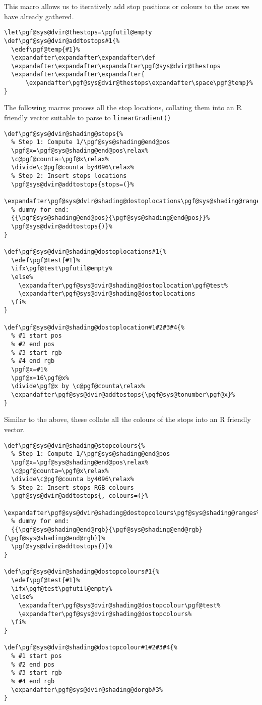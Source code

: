 \documentclass[]{article}
\begin{document}
This macro allows us to iteratively add stop positions or colours to the
ones we have already gathered.

\begin{verbatim}
\let\pgf@sys@dvir@thestops=\pgfutil@empty
\def\pgf@sys@dvir@addtostops#1{%
  \edef\pgf@temp{#1}%
  \expandafter\expandafter\expandafter\def
  \expandafter\expandafter\expandafter\pgf@sys@dvir@thestops
  \expandafter\expandafter\expandafter{
      \expandafter\pgf@sys@dvir@thestops\expandafter\space\pgf@temp}%
}
\end{verbatim}

The following macros process all the stop locations, collating them into
an R friendly vector suitable to parse to \texttt{linearGradient()}

\begin{verbatim}
\def\pgf@sys@dvir@shading@stops{%
  % Step 1: Compute 1/\pgf@sys@shading@end@pos
  \pgf@x=\pgf@sys@shading@end@pos\relax%
  \c@pgf@counta=\pgf@x\relax%
  \divide\c@pgf@counta by4096\relax%
  % Step 2: Insert stops locations 
  \pgf@sys@dvir@addtostops{stops=(}%
  \expandafter\pgf@sys@dvir@shading@dostoplocations\pgf@sys@shading@ranges%
  % dummy for end:
  {{\pgf@sys@shading@end@pos}{\pgf@sys@shading@end@pos}}%
  \pgf@sys@dvir@addtostops{)}%
}

\def\pgf@sys@dvir@shading@dostoplocations#1{%
  \edef\pgf@test{#1}%
  \ifx\pgf@test\pgfutil@empty%
  \else%
    \expandafter\pgf@sys@dvir@shading@dostoplocation\pgf@test%
    \expandafter\pgf@sys@dvir@shading@dostoplocations
  \fi%
}

\def\pgf@sys@dvir@shading@dostoplocation#1#2#3#4{%
  % #1 start pos
  % #2 end pos
  % #3 start rgb
  % #4 end rgb
  \pgf@x=#1%
  \pgf@x=16\pgf@x%
  \divide\pgf@x by \c@pgf@counta\relax%
  \expandafter\pgf@sys@dvir@addtostops{\pgf@sys@tonumber\pgf@x}%
}
\end{verbatim}

Similar to the above, these collate all the colours of the stops into an
R friendly vector.

\begin{verbatim}
\def\pgf@sys@dvir@shading@stopcolours{%
  % Step 1: Compute 1/\pgf@sys@shading@end@pos
  \pgf@x=\pgf@sys@shading@end@pos\relax%
  \c@pgf@counta=\pgf@x\relax%
  \divide\c@pgf@counta by4096\relax%
  % Step 2: Insert stops RGB colours
  \pgf@sys@dvir@addtostops{, colours=(}%
  \expandafter\pgf@sys@dvir@shading@dostopcolours\pgf@sys@shading@ranges%
  % dummy for end:
  {{\pgf@sys@shading@end@rgb}{\pgf@sys@shading@end@rgb}{\pgf@sys@shading@end@rgb}}%
  \pgf@sys@dvir@addtostops{)}%
}

\def\pgf@sys@dvir@shading@dostopcolours#1{%
  \edef\pgf@test{#1}%
  \ifx\pgf@test\pgfutil@empty%
  \else%
    \expandafter\pgf@sys@dvir@shading@dostopcolour\pgf@test%
    \expandafter\pgf@sys@dvir@shading@dostopcolours%
  \fi%
}

\def\pgf@sys@dvir@shading@dostopcolour#1#2#3#4{%
  % #1 start pos
  % #2 end pos
  % #3 start rgb
  % #4 end rgb
  \expandafter\pgf@sys@dvir@shading@dorgb#3%
}
\end{verbatim}
\end{document}
